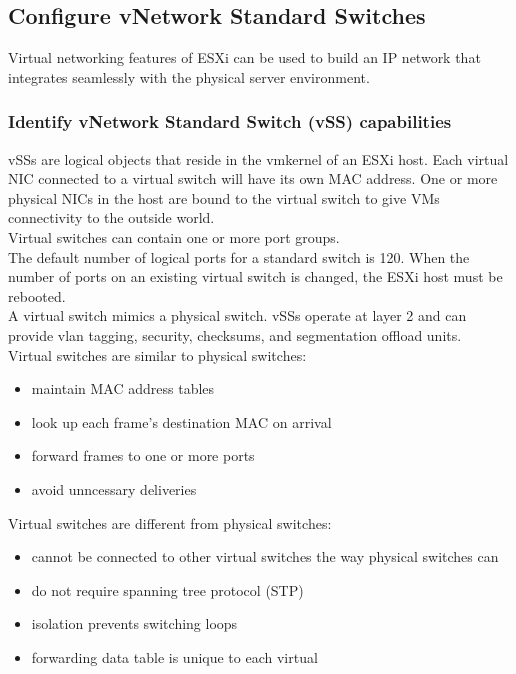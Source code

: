 \subsection{Configure vNetwork Standard Switches}

Virtual networking features of ESXi can be used to build an IP network that
integrates seamlessly with the physical server environment.

\subsubsection{Identify vNetwork Standard Switch (vSS) capabilities}

vSSs are logical objects that reside in the vmkernel of an ESXi host. Each
virtual NIC connected to a virtual switch will have its own MAC address.
One or more physical NICs in the host are bound to the virtual switch to give
VMs connectivity to the outside world.\\

Virtual switches can contain one or more port groups.\\

The default number of logical ports for a standard switch is 120. When the
number of ports on an existing virtual switch is changed, the ESXi host must be
rebooted.\\

A virtual switch mimics a physical switch. vSSs operate at layer 2 and can
provide vlan tagging, security, checksums, and segmentation offload units.\\

Virtual switches are similar to physical switches:

\begin{itemize}
\item maintain MAC address tables
\item look up each frame's destination MAC on arrival
\item forward frames to one or more ports
\item  avoid unncessary deliveries
\end{itemize}

Virtual switches are different from physical switches:

\begin{itemize}
\item cannot be connected to other virtual switches the way physical switches can
\item do not require spanning tree protocol (STP)
\item isolation prevents switching loops
\item forwarding data table is unique to each virtual
\end{itemize}

